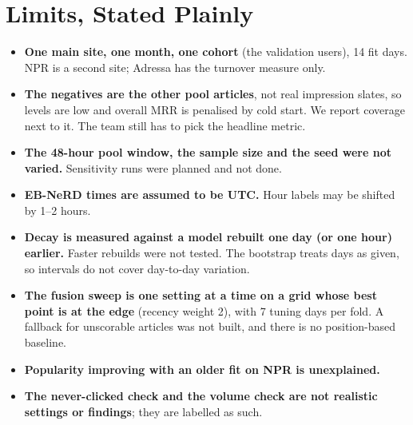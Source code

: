 \documentclass[11pt,a4paper]{article}
\begin{document}
\section{Limits, Stated Plainly}
\begin{itemize}
\item \textbf{One main site, one month, one cohort} (the validation users), 14 fit days. NPR is a second site; Adressa has the turnover measure only.
\item \textbf{The negatives are the other pool articles}, not real impression slates, so levels are low and overall MRR is penalised by cold start. We report coverage next to it. The team still has to pick the headline metric.
\item \textbf{The 48-hour pool window, the sample size and the seed were not varied.} Sensitivity runs were planned and not done.
\item \textbf{EB-NeRD times are assumed to be UTC.} Hour labels may be shifted by 1--2 hours.
\item \textbf{Decay is measured against a model rebuilt one day (or one hour) earlier.} Faster rebuilds were not tested. The bootstrap treats days as given, so intervals do not cover day-to-day variation.
\item \textbf{The fusion sweep is one setting at a time on a grid whose best point is at the edge} (recency weight 2), with 7 tuning days per fold. A fallback for unscorable articles was not built, and there is no position-based baseline.
\item \textbf{Popularity improving with an older fit on NPR is unexplained.}
\item \textbf{The never-clicked check and the volume check are not realistic settings or findings}; they are labelled as such.
\end{itemize}

\end{document}
